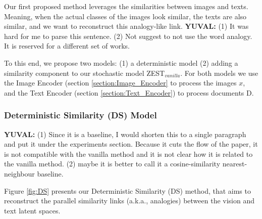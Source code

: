 \documentclass[11pt,a4paper]{article}
\newcommand\yuval[1]{\textcolor{darkpink}{\textbf{YUVAL:} #1 }}
\begin{document}
Our first proposed method leverages the similarities between images and texts. Meaning, when the actual classes of the images look similar, the texts are also similar,
and we want to reconstruct this analogy-like link. \yuval{(1) It was hard for me to parse this sentence. (2) Not suggest to not use the word analogy. It is reserved for a different set of works.}


 To this end, we propose two models: (1) a deterministic model (2) adding a similarity component to our stochastic model ZEST$_{vanilla}$.
For both models we use the Image Encoder (section \ref{section:Image_Encoder} to process the images $x$, and the Text Encoder (section \ref{section:Text_Encoder}) to process documents D.

\subsubsection{Deterministic Similarity (DS) Model}
\yuval{(1) Since it is a baseline, I would shorten this to a single paragraph and put it under the experiments section. Because it cuts the flow of the paper, it is not compatible with the vanilla method and it is not clear how it is related to the vanilla method. (2) maybe it is better to call it a cosine-similarity nearest-neighbour baseline. }

Figure \ref{fig:DS} presents our Deterministic Similarity (DS) method, that aims to  reconstruct  the parallel similarity links (a.k.a., analogies) between the  vision and text latent spaces. 

\end{document}
